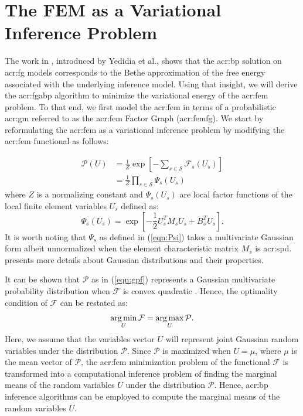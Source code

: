 \section{The FEM as a Variational Inference Problem}
\label{sec:FEMVI}


The work in \cite{bib:Yedidia2004CFEAAGBPA,bib:Yedidia2000genbp}, introduced by Yedidia et al., shows that the \gls{acr:bp} solution on \gls{acr:fg} models corresponds to the Bethe approximation of the free energy \cite{bib:Bethe,bib:Kikuchi} associated with the underlying inference model.
Using that insight, we will derive the \gls{acr:fgabp} algorithm to minimize the variational energy of the \gls{acr:fem} problem.
To that end, we first model the \gls{acr:fem} in terms of a probabilistic \gls{acr:gm} referred to as the \gls{acr:fem} Factor Graph (\gls{acr:femfg}).
We start by reformulating the \gls{acr:fem} as a variational inference problem by modifying the \gls{acr:fem} functional  as follows:

\begin{align}
	\mathcal{P}(U) & = \frac{1}{Z} \exp\left[ -  \sum_{s\in\mathcal{S}}\mathcal{F}_s(U_s) \right] \label{eqn:gpf}\\
	& = \frac{1}{Z} \prod_{s \in \mathcal{S}} \Psi_s(U_s) \label{eqn:fgpf}
\end{align}
where $Z$ is a normalizing constant and $\Psi_s(U_s)$ are local factor functions of the local finite element variables $U_s$ defined as:
\begin{equation}
	\Psi_s(U_s) = \exp\left[ -\frac{1}{2} U^T_s M_s U_s +B_s^T U_s\right]. \label{eqn:Psi}
\end{equation}
It is worth noting that $\Psi_s$ as defined in (\ref{eqn:Psi}) takes a multivariate Gaussian form albeit unnormalized when the element characteristic matrix $M_s$ is \gls{acr:spd}.
 presents more details about Gaussian distributions and their properties.

It can be shown that $\mathcal{P}$ as in (\ref{eqn:gpf}) represents a Gaussian multivariate probability distribution when $\mathcal{F}$ is convex quadratic \cite{bib:Wainwright2008GMEFAVI}.  Hence, the optimality condition of $\mathcal{F}$ can be restated as:
\begin{equation}
	\operatorname*{arg\,min}_{U} \mathcal{F} = \operatorname*{arg\,max}_{U} \mathcal{P}. \label{eqn:statPoint}
\end{equation}
Here, we assume that the variables vector $U$ will represent joint Gaussian random variables under the distribution $\mathcal{P}$.
Since $\mathcal{P}$ is maximized when $U = \mu$, where $\mu$ is the mean vector of $\mathcal{P}$, the \gls{acr:fem} minimization problem of the functional $\mathcal{F}$ is transformed into a computational inference problem of finding the marginal means of the random variables $U$ under the distribution $\mathcal{P}$.
Hence, \gls{acr:bp} inference algorithms can be employed to compute the marginal means of the random variables $U$.

